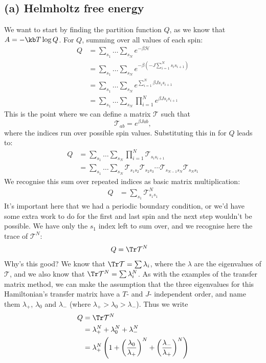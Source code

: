 \documentclass[../../PS3.tex]{subfiles}
\newcommand{\ham}{\mathcal{H}}
\newcommand{\trm}{\mathcal{T}}
\begin{document}
\subsection*{(a) Helmholtz free energy}
We want to start by finding the partition function $Q$, as we know that $A = -\kb T \log{Q}$.
For $Q$, summing over all values of each spin:
\begin{align}
	Q &= \sum_{s_1} \dotso \sum_{s_N}  e^{-\beta \ham} \\
	 &= \sum_{s_1} \dotso \sum_{s_N}  e^{-\beta \left(- J \sum_{i=1}^{N} s_i s_{i+1}\right)} \\
	 &= \sum_{s_1} \dotso \sum_{s_N}  e^{\sum_{i=1}^{N}  \beta J s_i s_{i+1}} \\
	 &= \sum_{s_1} \dotso \sum_{s_N} \prod_{i=1}^N  e^{\beta J s_i s_{i+1}}
\end{align}
This is the point where we can define a matrix $\trm$ such that 
\begin{equation} \label{eq:Prob6a:trmdef}
\trm_{ab} = e^{\beta J a b},
\end{equation} where the indices run over possible spin values. Substituting this in for $Q$ leads to:
\begin{align}
	Q &= \sum_{s_1} \dotso \sum_{s_N} \prod_{i=1}^N  \trm_{s_i s_{i+1}} \\
	&= \sum_{s_1} \dotso \sum_{s_N} \trm_{s_1 s_2} \trm_{s_2 s_3} \dotsm \trm_{s_{N-1} s_N}\trm_{s_N s_1}
\end{align}
We recognise this sum over repeated indices as basic matrix multiplication:
\begin{align}
	Q &= \sum_{s_1} \trm^N_{s_1 s_1} 
\end{align}
It's important here that we had a periodic boundary condition, or we'd have some extra work to do for the first and last spin and the next step wouldn't be possible. We have only the $s_1$ index left to sum over, and we recognise here the trace of $\trm^N$:
\begin{align}
	Q &= \Tr \trm^N
\end{align}
Why's this good? We know that $\Tr \trm = \sum \lambda_i$, where the $\lambda$ are the eigenvalues of $\trm$, and we also know that $\Tr \trm^N = \sum \lambda_i^N$. As with the examples of the transfer matrix method, we can make the assumption that the three eigenvalues for this Hamiltonian's transfer matrix have a $T$- and $J$- independent order, and name them $\lambda_+$, $\lambda_0$ and $\lambda_-$ (where $\lambda_+ > \lambda_0 > \lambda_-$). Thus we write
\begin{align}
	Q &= \Tr \trm^N \\
	&= \lambda_+^N + \lambda_0^N + \lambda_-^N \\
	&= \lambda_+^N \left(1 + \left(\frac{\lambda_0}{\lambda_+}\right)^N + \left(\frac{\lambda_-}{\lambda_+}\right)^N \right)
\end{align} 
\end{document}
